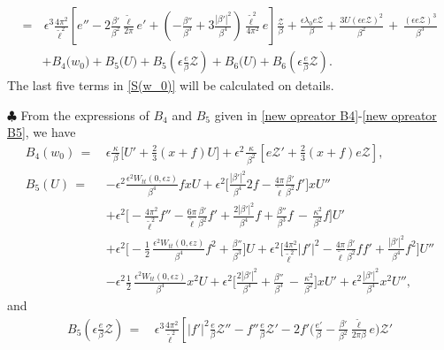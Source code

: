 \documentclass[10pt, reqno]{amsart}
\numberwithin{equation}{section}
\theoremstyle{definition}
\begin{document}
{{\begin{align}
=&\, \epsilon^3\frac{4\pi^2}{{\tilde\ell}^2} \left[e''- 2\frac{\beta'} {\beta^2} \frac{\tilde \ell} {2\pi} e' +\left(- \frac{\beta''} {\beta^3} + 3\frac{|\beta'|^2} {\beta^4} \right) \frac{\tilde \ell^2} {4\pi^2}e\right]\frac{\mathcal Z}\beta+\frac{\epsilon\lambda_0 e{\mathcal Z}}{\beta}
 +\frac{3U(\epsilon e{\mathcal Z} )^2}{\beta^2}\,+\, \frac{(\epsilon e{\mathcal Z} )^3}{\beta^3}
\nonumber\\[2mm]
& + B_4\big(w_0\big)
+ B_5\big(U\big) + B_5\left(\epsilon\frac{e}{\beta}{\mathcal Z} \right)
+ B_6\big(U\big) + B_6\left(\epsilon\frac{e}{\beta}{\mathcal Z} \right).
\end{align}
The last five terms in \eqref{S(w_0)} will be calculated on details.

\smallskip
\noindent$\clubsuit$
From the expressions of $B_4$ and $B_5$ given in \eqref{new opreator B4}-\eqref{new opreator B5}, we have
\begin{align*}
B_4(w_0)\,=\,&
\epsilon\frac{\kappa}{\, \beta\, } \Big[ U'+\frac{2}{3} (x+f) U\Big]
+\epsilon^2 \frac{\kappa}{\, \beta^2\, } \left[ e {\mathcal Z}' +\frac{2}{3} (x+f) e{\mathcal Z}\right],
\nonumber\\[2mm]
B_5(U)
\,=\,&
-\epsilon^2\frac{\epsilon^2W_{tt}(0, \epsilon z)}{\beta^4}f xU
+\epsilon^2\Big[\frac{|\beta'|^2}{\beta^4} 2f
-\frac{4\pi}{{\tilde\ell}}\frac{\beta'}{\beta^2}f'
\Big]xU''
\nonumber\\[2mm]
&
+\epsilon^2\Big[
-\frac{4\pi^2}{{\tilde\ell}^2}f''
-\frac{6\pi}{\tilde\ell} \frac{\beta'}{\beta^2} f'
+\frac{2|\beta'|^2}{\beta^4}f
+\frac{\beta''} {\beta^3}f
\,-\,\frac{\kappa^2}{\beta^2}f
\Big]U'
\nonumber\\[2mm]
&
+ \epsilon^2\Big[
-\frac{1}{2}\, \frac{\epsilon^2 W_{tt}(0, \epsilon z)}{\beta^4}f^2 + \frac{\beta''} {\beta^3}
\Big]U
+\epsilon^2\Big[\frac{4\pi^2}{{\tilde\ell}^2}|f'|^2
-\frac{4\pi}{{\tilde\ell}}\frac{\beta'}{\beta^2}ff'
+\frac{|\beta'|^2}{\beta^4} f^2
\Big]U''
\nonumber\\[2mm]
&
-\epsilon^2\frac{1}{2}\, \frac{\epsilon^2W_{tt}(0, \epsilon z)}{\beta^4} x^2U
+\epsilon^2\Big[\frac{2|\beta'|^2}{\beta^4}
+\frac{\beta''} {\beta^3}
\,-\,\frac{\kappa^2}{\beta^2}
\Big]xU'
+\epsilon^2 \frac{|\beta'|^2}{\beta^4} x^2 U'',
\end{align*}
and
\begin{align*}
 B_5\left(\epsilon\frac{e}{\beta}{\mathcal Z} \right)
\,=\,&
\epsilon^3\frac{4\pi^2}{{\tilde\ell}^2}
\left[
|f'|^2 \frac{e}{\beta} {\mathcal Z}''
-f'' \frac{e}{\beta} {\mathcal Z}'
-2f' \Big(\frac{e'}{\beta}- \frac{\beta'} {\beta^2}\frac{\tilde \ell} {2\pi \beta} e\Big){\mathcal Z}'

\end{align*}}}
\end{document}
